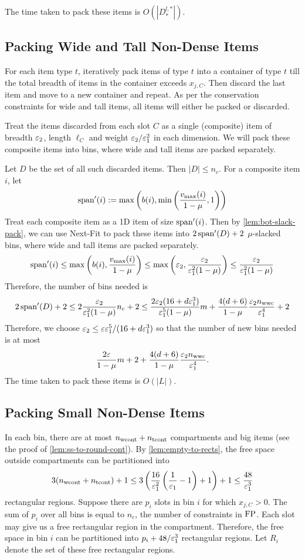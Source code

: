 The time taken to pack these items is $O(|D^{l,*}_{*}|)$.

\subsection{Packing Wide and Tall Non-Dense Items}
\label{sec:algo:pack-wide}

For each item type $t$, iteratively pack items of type $t$ into a container of type $t$
till the total breadth of items in the container exceeds $x_{j,C}$. Then discard
the last item and move to a new container and repeat. As per the conservation constraints
for wide and tall items, all items will either be packed or discarded.

Treat the items discarded from each slot $C$ as a single (composite) item of breadth $\varepsilon_2$,
length $\ell_C$ and weight $\varepsilon_2/\varepsilon_1^2$ in each dimension.
We will pack these composite items into bins, where wide and tall items are packed separately.

Let $D$ be the set of all such discarded items. Then $|D| \le n_c$.
For a composite item $i$, let
\[ \operatorname{span}'(i) := \max\left(b(i), \min\left(\frac{v_{\max}(i)}{1-\mu}, 1\right)\right) \]
Treat each composite item as a 1D item of size $\operatorname{span}'(i)$.
Then by \cref{lem:bot-slack-pack}, we can use Next-Fit to pack these items
into $2\operatorname{span}'(D) + 2$ $\mu$-slacked bins, where wide and tall items are packed separately.
\[ \operatorname{span}'(i) \le \max\left(b(i), \frac{v_{\max}(i)}{1-\mu}\right)
\le \max\left(\varepsilon_2, \frac{\varepsilon_2}{\varepsilon_1^2(1-\mu)}\right)
\le \frac{\varepsilon_2}{\varepsilon_1^2(1-\mu)} \]
Therefore, the number of bins needed is
\[ 2\operatorname{span}'(D) + 2 \le 2\frac{\varepsilon_2}{\varepsilon_1^2(1-\mu)} n_c + 2
\le \frac{2\varepsilon_2(16 + d\varepsilon_1^3)}{\varepsilon_1^5(1-\mu)}m
    + \frac{4(d+6)}{1-\mu} \frac{\varepsilon_2 n_{\mathrm{wwc}}}{\varepsilon_1^4} + 2 \]
Therefore, we choose
$\varepsilon_2 \le \varepsilon\varepsilon_1^5/(16 + d\varepsilon_1^3)$
so that the number of new bins needed is at most
\[ \frac{2\varepsilon}{1-\mu}m + 2 + \frac{4(d+6)}{1-\mu} \frac{\varepsilon_2 n_{\mathrm{wwc}}}{\varepsilon_1^4}. \]
The time taken to pack these items is $O(|L|)$.

\subsection{Packing Small Non-Dense Items}
\label{sec:algo:pack-small}

In each bin, there are at most $n_{\mathrm{wcont}} + n_{\mathrm{tcont}}$ compartments and big items
(see the proof of \cref{lem:ss-to-round-cont}).
By \cref{lem:empty-to-rects}, the free space outside compartments can be partitioned into
\[ 3(n_{\mathrm{wcont}} + n_{\mathrm{tcont}}) + 1
\le 3\left(\frac{16}{\varepsilon_1^2}\left(\frac{1}{\varepsilon_1} - 1\right) + 1\right) + 1
\le \frac{48}{\varepsilon_1^3} \]
rectangular regions.
Suppose there are $p_i$ slots in bin $i$ for which $x_{j,C} > 0$.
The sum of $p_i$ over all bins is equal to $n_c$, the number of constraints in $\operatorname{FP}$.
Each slot may give us a free rectangular region in the compartment.
Therefore, the free space in bin $i$ can be partitioned into $p_i + 48/\varepsilon_1^3$
rectangular regions. Let $R_i$ denote the set of these free rectangular regions.

